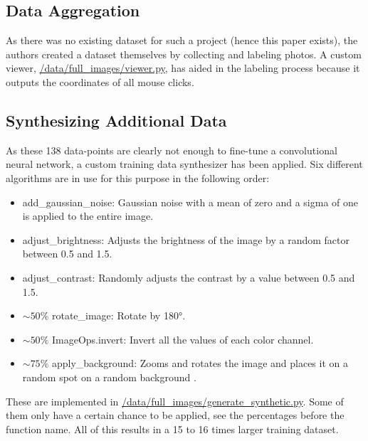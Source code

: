 \documentclass[a4paper,11pt]{report}
\begin{document}
            \subsection{Data Aggregation}
                As there was no existing dataset for such a project (hence this paper exists), the authors created a dataset themselves by collecting and labeling photos. A custom viewer, \href{https://github.com/lenamerkli/ingredient-scanner/tree/main/data/full_images/frames_json}{/data/full\_images/viewer.py}, has aided in the labeling process because it outputs the coordinates of all mouse clicks.
                
            \subsection{Synthesizing Additional Data}
                As these 138 data-points are clearly not enough to fine-tune a convolutional neural network, a custom training data synthesizer has been applied. Six different algorithms are in use for this purpose in the following order:
                \begin{itemize}
                    \item add\_gaussian\_noise: Gaussian noise \cite{gaussian-noise} with a mean of zero and a sigma of one is applied to the entire image.
                    \item adjust\_brightness: Adjusts the brightness of the image by a random factor between 0.5 and 1.5.
                    \item adjust\_contrast: Randomly adjusts the contrast by a value between 0.5 and 1.5.
                    \item $\sim 50\%$ rotate\_image: Rotate by 180°.
                    \item $\sim 50\%$ ImageOps.invert: Invert all the values of each color channel.
                    \item $\sim 75\%$ apply\_background: Zooms and rotates the image and places it on a random spot on a random background \cite{indoorCVPR_09}.
                \end{itemize}
                These are implemented in \href{https://github.com/lenamerkli/ingredient-scanner/blob/main/data/full_images/generate_synthetic.py}{/data/full\_images/generate\_synthetic.py}. Some of them only have a certain chance to be applied, see the percentages before the function name. All of this results in a 15 to 16 times larger training dataset.
                
\end{document}
